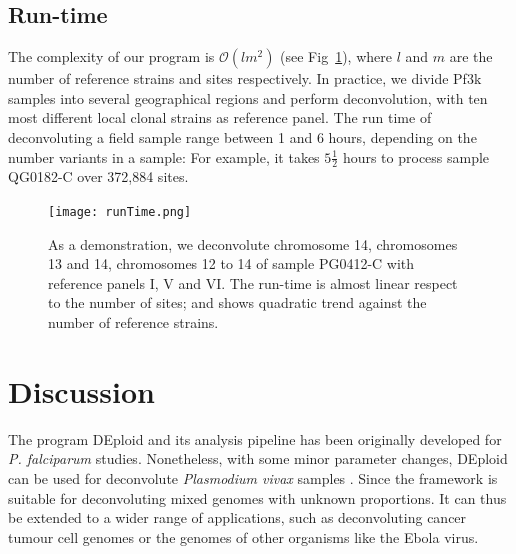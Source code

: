 \documentclass{bioinfo}
\begin{document}

\subsection{Run-time}
The complexity of our program is $\mathcal{O}(lm^2)$ (see Fig~\ref{fig:runtime}), where $l$ and $m$ are the number of reference strains and sites respectively. In practice, we divide Pf3k samples into several geographical regions and perform deconvolution, with ten most different local clonal strains as reference panel. The run time of deconvoluting a field sample range between 1 and 6 hours, depending on the number variants in a sample: For example, it takes $5\frac{1}{2}$ hours to process sample {\textmd QG0182-C} over 372,884 sites.


\begin{figure}[htb]
\centering
\texttt{[image: runTime.png]}
\caption{As a demonstration, we deconvolute chromosome 14, chromosomes 13 and 14, chromosomes 12 to 14 of sample {\textmd PG0412-C} with reference panels I, V and VI. The run-time is almost linear respect to the number of sites; and shows quadratic trend against the number of reference strains.}\label{fig:runtime}
\end{figure}

\section{Discussion}
The program DEploid and its analysis pipeline has been originally developed for {\it P. falciparum} studies. Nonetheless, with some minor parameter changes, DEploid can be used for deconvolute {\it Plasmodium vivax} samples \citep{Pearson2016}. Since the framework is suitable for deconvoluting mixed genomes with unknown proportions. It can thus be extended to a wider range of applications, such as deconvoluting cancer tumour cell genomes or the genomes of other organisms like the Ebola virus.
\end{document}
